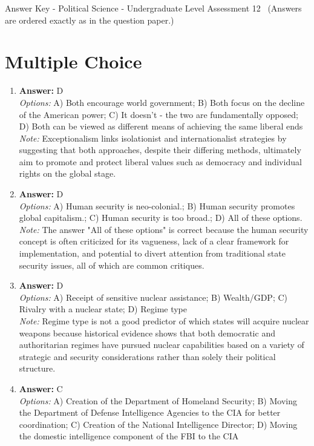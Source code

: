 \documentclass[12pt]{article}
\begin{document}
\begin{center}
Answer Key - Political Science - Undergraduate Level Assessment 12 \
\small (Answers are ordered exactly as in the question paper.)
\end{center}

\section*{Multiple Choice}
\begin{enumerate}[label=\arabic*.]
\item \textbf{Answer:} D
\\ \textit{Options:} A) Both encourage world government; B) Both focus on the decline of the American power; C) It doesn't - the two are fundamentally opposed; D) Both can be viewed as different means of achieving the same liberal ends
\\ \textit{Note:} Exceptionalism links isolationist and internationalist strategies by suggesting that both approaches, despite their differing methods, ultimately aim to promote and protect liberal values such as democracy and individual rights on the global stage.
\item \textbf{Answer:} D
\\ \textit{Options:} A) Human security is neo-colonial.; B) Human security promotes global capitalism.; C) Human security is too broad.; D) All of these options.
\\ \textit{Note:} The answer "All of these options" is correct because the human security concept is often criticized for its vagueness, lack of a clear framework for implementation, and potential to divert attention from traditional state security issues, all of which are common critiques.
\item \textbf{Answer:} D
\\ \textit{Options:} A) Receipt of sensitive nuclear assistance; B) Wealth/GDP; C) Rivalry with a nuclear state; D) Regime type
\\ \textit{Note:} Regime type is not a good predictor of which states will acquire nuclear weapons because historical evidence shows that both democratic and authoritarian regimes have pursued nuclear capabilities based on a variety of strategic and security considerations rather than solely their political structure.
\item \textbf{Answer:} C
\\ \textit{Options:} A) Creation of the Department of Homeland Security; B) Moving the Department of Defense Intelligence Agencies to the CIA for better coordination; C) Creation of the National Intelligence Director; D) Moving the domestic intelligence component of the FBI to the CIA

\end{enumerate}
\end{document}
